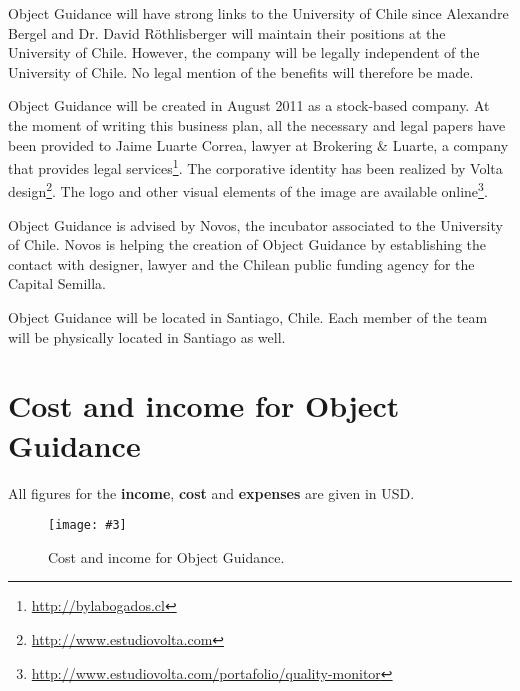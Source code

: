 \documentclass[runningheads]{llncs}
\newcommand{\fig}[4]{
	\begin{figure}[#1]
		\centering
		\texttt{[image: \#3]}
		\caption{\label{fig:#3}#4}
	\end{figure}}
\begin{document}
Object Guidance will have strong links to the University of Chile since Alexandre Bergel and Dr. David R\"othlisberger will maintain their positions at the University of Chile. However, the company will be legally independent of the University of Chile. No legal mention of the benefits will therefore be made. 

Object Guidance will be created in August 2011 as a stock-based company. At the moment of writing this business plan, all the necessary and legal papers have been provided to Jaime Luarte Correa, lawyer at Brokering \& Luarte, a company that provides legal services\footnote{\url{http://bylabogados.cl}}. The corporative identity has been realized by Volta design\footnote{\url{http://www.estudiovolta.com}}. The logo and other visual elements of the image are available online\footnote{\url{http://www.estudiovolta.com/portafolio/quality-monitor}}.

Object Guidance is advised by Novos, the incubator associated to the University of Chile. Novos is helping the creation of Object Guidance by establishing the contact with designer, lawyer and the Chilean public funding agency for the Capital Semilla.

Object Guidance will be located in Santiago, Chile. Each member of the team will be physically located in Santiago as well.




\appendix
\section{Cost and income for Object Guidance}

All figures for the \textbf{income}, \textbf{cost} and \textbf{expenses} are given in USD.

\fig{}{1.3}{incomeSheet}{Cost and income for Object Guidance.}
\end{document}

